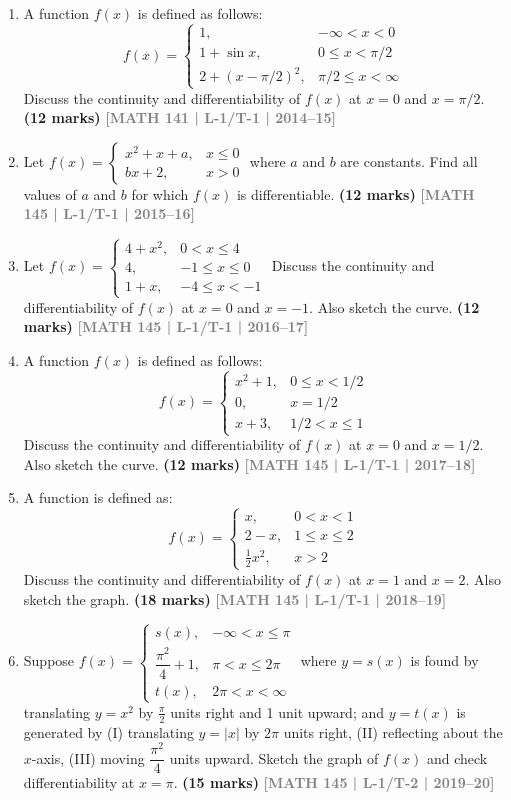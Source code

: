 \documentclass[12pt,a4paper]{article}
\newcommand{\yr}[1]{\hfill\textcolor{gray}{\small\textbf{[#1]}}}
\newcommand{\mk}[1]{\textcolor{orange!70!black}{\small\textbf{(#1 marks)}}}
\begin{document}
\begin{enumerate}
\item A function $f(x)$ is defined as follows:
\[
f(x)=\begin{cases}1, & -\infty<x<0\\ 1+\sin x, & 0\le x<\pi/2\\ 2+(x-\pi/2)^{2}, & \pi/2\le x<\infty\end{cases}
\]
Discuss the continuity and differentiability of $f(x)$ at $x=0$ and $x=\pi/2$.
\mk{12} \yr{MATH 141 | L-1/T-1 | 2014--15}

\item Let $f(x)=\begin{cases}x^{2}+x+a, & x\le 0\\ bx+2, & x>0\end{cases}$ where $a$ and $b$ are constants. Find all values of $a$ and $b$ for which $f(x)$ is differentiable.
\mk{12} \yr{MATH 145 | L-1/T-1 | 2015--16}

\item Let $f(x)=\begin{cases}4+x^{2}, & 0<x\le 4\\ 4, & -1\le x\le 0\\ 1+x, & -4\le x<-1\end{cases}$ Discuss the continuity and differentiability of $f(x)$ at $x=0$ and $x=-1$. Also sketch the curve.
\mk{12} \yr{MATH 145 | L-1/T-1 | 2016--17}

\item A function $f(x)$ is defined as follows:
\[
f(x)=\begin{cases}x^{2}+1, & 0\le x<1/2\\ 0, & x=1/2\\ x+3, & 1/2<x\le 1\end{cases}
\]
Discuss the continuity and differentiability of $f(x)$ at $x=0$ and $x=1/2$. Also sketch the curve.
\mk{12} \yr{MATH 145 | L-1/T-1 | 2017--18}

\item A function is defined as:
\[
f(x)=\begin{cases}x, & 0<x<1\\ 2-x, & 1\le x\le 2\\ \tfrac{1}{2}x^{2}, & x>2\end{cases}
\]
Discuss the continuity and differentiability of $f(x)$ at $x=1$ and $x=2$. Also sketch the graph.
\mk{18} \yr{MATH 145 | L-1/T-1 | 2018--19}

\item Suppose $f(x)=\begin{cases}s(x), & -\infty<x\le\pi\\ \dfrac{\pi^{2}}{4}+1, & \pi<x\le 2\pi\\ t(x), & 2\pi<x<\infty\end{cases}$ where $y=s(x)$ is found by translating $y=x^{2}$ by $\frac{\pi}{2}$ units right and 1 unit upward; and $y=t(x)$ is generated by (I) translating $y=|x|$ by $2\pi$ units right, (II) reflecting about the $x$-axis, (III) moving $\dfrac{\pi^{2}}{4}$ units upward. Sketch the graph of $f(x)$ and check differentiability at $x=\pi$.
\mk{15} \yr{MATH 145 | L-1/T-2 | 2019--20}


\end{enumerate}
\end{document}
